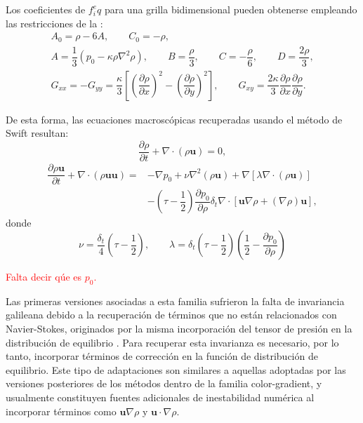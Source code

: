 Los coeficientes de $f_i^eq$ para una grilla bidimensional pueden obtenerse empleando las restricciones de la :
\begin{equation}
	\begin{gathered}
		A_0 = \rho - 6 A, \qquad C_0 = -\rho, \\
		A = \dfrac{1}{3}(p_0-\kappa \rho \nabla^2 \rho), \qquad B = \dfrac{\rho}{3}, \qquad C = -\dfrac{\rho}{6}, \qquad  D = \dfrac{2\rho}{3},  \\
		G_{xx} = -G_{yy} = \dfrac{\kappa}{3}\left[ \left(\dfrac{\partial \rho}{\partial x}\right)^2 - \left(\dfrac{\partial \rho}{\partial y}\right)^2 \right], \qquad G_{xy}=\dfrac{2\kappa}{3}\dfrac{\partial \rho}{\partial x} \dfrac{\partial \rho}{\partial y}.
	\end{gathered}
\end{equation}

De esta forma, las ecuaciones macrosc\'opicas recuperadas usando el m\'etodo de Swift resultan:
\begin{equation}
	\dfrac{\partial \rho}{\partial t} + \nabla \cdot (\rho \bm{u}) = 0,
\end{equation}
\begin{align}
	\dfrac{\partial \rho \bm{u}}{\partial t} + \nabla \cdot (\rho \bm{uu}) =& -\nabla p_0 + \nu \nabla^2 (\rho \bm{u})+\nabla[\lambda \nabla \cdot (\rho \bm{u})]		\\
	&-\left( \tau - \dfrac{1}{2} \right)\dfrac{\partial p_0}{\partial \rho} \delta_t \nabla \cdot [\bm{u}\nabla \rho + (\nabla \rho)\bm{u}],
\end{align}
donde 
\begin{equation}
	\nu = \dfrac{\delta_t}{4}\left( \tau - \dfrac{1}{2} \right), \qquad \lambda = \delta_t\left( \tau - \dfrac{1}{2} \right)\left( \dfrac{1}{2} - \dfrac{\partial p_0}{\partial \rho}\right)
\end{equation}

\textcolor{red}{Falta decir q\'ue es $p_0$.}

Las primeras versiones asociadas a esta familia sufrieron la falta de invariancia galileana debido a la recuperaci\'on de t\'erminos que no est\'an relacionados con Navier-Stokes, originados por la misma incorporaci\'on del tensor de presi\'on en la distribuci\'on de equilibrio \cite{kuzmin_multi-relaxation_2008}. Para recuperar esta invarianza es necesario, por lo tanto, incorporar t\'erminos de correcci\'on en la funci\'on de distribuci\'on de equilibrio. Este tipo de adaptaciones son similares a aquellas adoptadas por las versiones posteriores de los m\'etodos dentro de la familia color-gradient, y usualmente constituyen fuentes adicionales de inestabilidad num\'erica al incorporar t\'erminos como $\bm{u}\nabla\rho$ y $\bm{u}\cdot\nabla\rho$.

